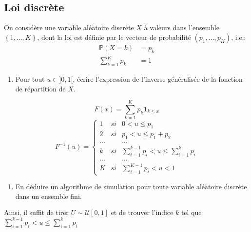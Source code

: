 \documentclass[]{article}
\providecommand{\tightlist}{%
  \setlength{\itemsep}{0pt}\setlength{\parskip}{0pt}}
\newenvironment{Correction}%
  { \vspace{\baselineskip}\begin{mdframed}[backgroundcolor=my_green]}%
  {\end{mdframed}}
\begin{document}
\hypertarget{loi-discruxe8te}{%
\subsection{Loi discrète}\label{loi-discruxe8te}}

\label{exo:inv:disc} On considère une variable aléatoire discrète \(X\)
à valeurs dans l'ensemble \(\left\lbrace 1,\dots, K\right\rbrace\), dont
la loi est définie par le vecteur de probabilité \((p_1, \dots, p_K)\),
i.e.: \begin{align}
\mathbb{P}(X = k) &= p_k\\
\sum_{k = 1}^K p_k &= 1
\end{align}

\begin{enumerate}
\def\labelenumi{\arabic{enumi}.}
\tightlist
\item
  Pour tout \(u \in ]0, 1[\), écrire l'expression de l'inverse
  généralisée de la fonction de répartition de \(X\).
\end{enumerate}

\begin{Correction}

$$F(x) = \sum_{k = 1}^{K}p_k\mathbf{1}_{k \leq x}$$
$$F^{-1}(u) = \left\lbrace
\begin{array}{lcr}
1 &si&0 < u \leq p_1\\
2 &si&p_1 < u \leq p_1 + p_2\\
\dots & & \dots\\
k &si &\sum_{i = 1}^{k - 1} p_i < u \leq \sum_{i = 1}^{k} p_i\\
\dots & & \dots\\
K&si& \sum_{i = 1}^{K - 1} p_i < u < 1
\end{array}
\right.$$

\end{Correction}

\begin{enumerate}
\def\labelenumi{\arabic{enumi}.}
\setcounter{enumi}{1}
\tightlist
\item
  En déduire un algorithme de simulation pour toute variable aléatoire
  discrète dans un ensemble fini.
\end{enumerate}

\begin{Correction}

Ainsi, il suffit de tirer $U\sim \mathcal{U}[0, 1]$ et de trouver l'indice $k$ tel que $\sum_{i = 1}^{k - 1} p_i < u \leq \sum_{i = 1}^{k} p_i$

\end{Correction}
\end{document}
